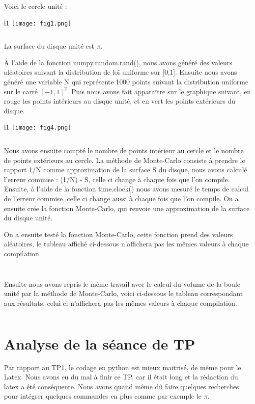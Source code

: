 \documentclass{article}
\begin{document}
Voici le cercle unité :

\begin{wrapfigure}{l}{1\textwidth}
        \centering
        \texttt{[image: fig1.png]}
       
\end{wrapfigure}

$$ $$
$$ $$
$$ $$
$$ $$
$$ $$
$$ $$
$$ $$
$$ $$
$$ $$
$$ $$
$$ $$

La surface du disque unité est $\pi$.

A l'aide de la fonction numpy.random.rand(), nous avons généré des valeurs aléatoires suivant la distribution de loi uniforme sur [0,1]. Ensuite nous avons généré une variable N qui représente 1000 points suivant la distribution uniforme sur le carré $[-1,1]^2$. Puis nous avons fait apparaître sur le graphique suivant, en rouge les points intérieurs au disque unité, et en vert les points extérieurs du disque. 

\begin{wrapfigure}{l}{1\textwidth}
        \centering
        \texttt{[image: fig4.png]}
       
\end{wrapfigure}

$$ $$
$$ $$
$$ $$
$$ $$
$$ $$
$$ $$
$$ $$
$$ $$
$$ $$


Nous avons ensuite compté le nombre de points intérieur au cercle et le nombre de points extérieurs au cercle. La méthode de Monte-Carlo consiste à prendre le rapport 1/N comme approximation de la surface S du disque, nous avons calculé l'erreur commise : (1/N) - S, celle ci change à chaque fois que l'on compile. Ensuite, à l'aide de la fonction time.clock() nous avons mesuré le temps de calcul de l'erreur commise, celle ci change aussi à chaque fois que l'on compile. On a ensuite crée la fonction Monte-Carlo, qui renvoie une approximation de la surface du disque unité.
\newline
\newline

On a ensuite testé la fonction Monte-Carlo, cette fonction prend des valeurs aléatoires, le tableau affiché ci-dessous n'affichera pas les mêmes valeurs à chaque compilation.

$$ $$

$$ $$

Ensuite nous avons repris le même travail avec le calcul du volume de la boule unité par la méthode de Monte-Carlo, voici ci-dessous le tableau correspondant aux résultats, celui ci n'affichera pas les mêmes valeurs à chaque compilation. 

$$ $$
$$ $$
$$ $$
$$ $$


\section{Analyse de la séance de TP}
$$ $$
Par rapport au TP1, le codage en python est mieux maitrisé, de même pour le Latex.
Nous avons eu du mal à finir ce TP, car il était long et la rédaction du latex a été conséquente. Nous avons quand même dû faire quelques recherches pour intégrer quelques commandes en plus comme par exemple le $\pi$.
\end{document}
